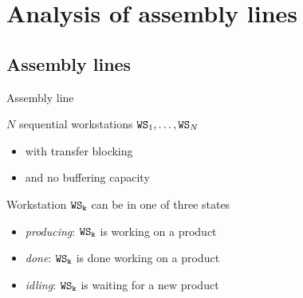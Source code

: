 
\section{Analysis of assembly lines}
  \subsection{Assembly lines}
    \begin{frame}{Assembly line}
      \begin{center}\scalebox{0.9}{}\end{center}
      
      \vspace{1em}
      \begin{minipage}{0.6\textwidth}
        $N$ sequential workstations $\mathtt{WS}_1, \dots, \mathtt{WS}_N$
        \begin{itemize}
          \item with transfer blocking
          \item and no buffering capacity
        \end{itemize}
        
        \vspace{1em}
        Workstation $\mathtt{WS_k}$ can be in one of three states
        \begin{itemize}
          \item \textit{producing}: $\mathtt{WS_k}$ is working on a product
          \item \textit{done}: $\mathtt{WS_k}$ is done working on a product
          \item \textit{idling}: $\mathtt{WS_k}$ is waiting for a new product
        \end{itemize}
      \end{minipage}
      \begin{minipage}{0.35\textwidth}
        \begin{center}\scalebox{0.8}{}\end{center}
    \end{minipage}
    \end{frame}
    
